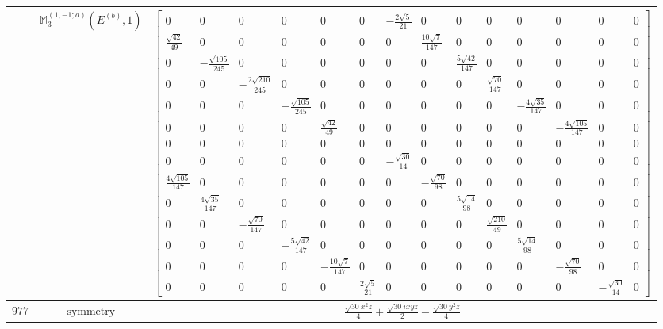 \documentclass[fleqn,8pt,landscape]{jsarticle}
\begin{document}
\begin{longtable}{ccc}
$  $ & $ \mathbb{M}_{3}^{(1,-1;a)}(E^{(b)},1) $ & $ \begin{bmatrix} 0 & 0 & 0 & 0 & 0 & 0 & - \frac{2 \sqrt{5}}{21} & 0 & 0 & 0 & 0 & 0 & 0 & 0 \\ \frac{\sqrt{42}}{49} & 0 & 0 & 0 & 0 & 0 & 0 & \frac{10 \sqrt{7}}{147} & 0 & 0 & 0 & 0 & 0 & 0 \\ 0 & - \frac{\sqrt{105}}{245} & 0 & 0 & 0 & 0 & 0 & 0 & \frac{5 \sqrt{42}}{147} & 0 & 0 & 0 & 0 & 0 \\ 0 & 0 & - \frac{2 \sqrt{210}}{245} & 0 & 0 & 0 & 0 & 0 & 0 & \frac{\sqrt{70}}{147} & 0 & 0 & 0 & 0 \\ 0 & 0 & 0 & - \frac{\sqrt{105}}{245} & 0 & 0 & 0 & 0 & 0 & 0 & - \frac{4 \sqrt{35}}{147} & 0 & 0 & 0 \\ 0 & 0 & 0 & 0 & \frac{\sqrt{42}}{49} & 0 & 0 & 0 & 0 & 0 & 0 & - \frac{4 \sqrt{105}}{147} & 0 & 0 \\ 0 & 0 & 0 & 0 & 0 & 0 & 0 & 0 & 0 & 0 & 0 & 0 & 0 & 0 \\ 0 & 0 & 0 & 0 & 0 & 0 & - \frac{\sqrt{30}}{14} & 0 & 0 & 0 & 0 & 0 & 0 & 0 \\ \frac{4 \sqrt{105}}{147} & 0 & 0 & 0 & 0 & 0 & 0 & - \frac{\sqrt{70}}{98} & 0 & 0 & 0 & 0 & 0 & 0 \\ 0 & \frac{4 \sqrt{35}}{147} & 0 & 0 & 0 & 0 & 0 & 0 & \frac{5 \sqrt{14}}{98} & 0 & 0 & 0 & 0 & 0 \\ 0 & 0 & - \frac{\sqrt{70}}{147} & 0 & 0 & 0 & 0 & 0 & 0 & \frac{\sqrt{210}}{49} & 0 & 0 & 0 & 0 \\ 0 & 0 & 0 & - \frac{5 \sqrt{42}}{147} & 0 & 0 & 0 & 0 & 0 & 0 & \frac{5 \sqrt{14}}{98} & 0 & 0 & 0 \\ 0 & 0 & 0 & 0 & - \frac{10 \sqrt{7}}{147} & 0 & 0 & 0 & 0 & 0 & 0 & - \frac{\sqrt{70}}{98} & 0 & 0 \\ 0 & 0 & 0 & 0 & 0 & \frac{2 \sqrt{5}}{21} & 0 & 0 & 0 & 0 & 0 & 0 & - \frac{\sqrt{30}}{14} & 0 \end{bmatrix} $ \\ \hline
$ 977 $ & $ \text{symmetry} $ & $ \frac{\sqrt{30} x^{2} z}{4} + \frac{\sqrt{30} i x y z}{2} - \frac{\sqrt{30} y^{2} z}{4} $ \\

\end{longtable}
\end{document}
